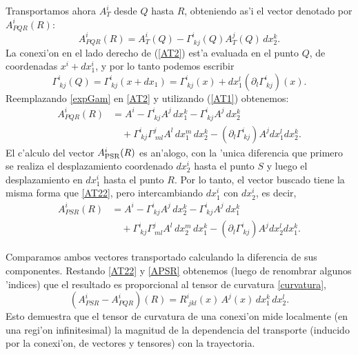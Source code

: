 Transportamos ahora $A_{T}^i $ desde $Q$ hasta $R$, obteniendo as'i el vector denotado por $A_{PQR}^i (R)$:
\begin{equation}
A_{PQR}^i (R) = A_{T}^i (Q) -\Gamma_{\ kj}^i(Q)A_{T}^j (Q)\,dx_2^k. \label{AT2}%
\end{equation}
 La conexi'on en el lado derecho de (\ref{AT2}) est'a evaluada en el punto $Q$, de coordenadas $x^i +dx_1^i$, y por lo tanto podemos escribir
\begin{equation}
\Gamma_{\ kj}^i(Q)=\Gamma_{\ kj}^i (x+dx_1)=\Gamma_{\ kj}^i(x)+dx_1^l(\partial_l\Gamma_{\ kj}^i) (x) . \label{expGam}
\end{equation}
Reemplazando \eqref{expGam} en \eqref{AT2} y utilizando (\ref{AT1}) obtenemos:%
\begin{align}
A_{PQR}^i (R) &= A^i -\Gamma_{\ kj}^i A^j\,dx_1^k-\Gamma_{\ kj}^i A^j\,dx_2^k \nonumber\\
& \quad  +\Gamma_{\ kj}^i \Gamma_{\ ml}^jA^l\, dx_1^m\,dx_2^k -(\partial_l\Gamma_{\ kj}^i) A^j dx_1^l dx_2^k. \label{AT22}
\end{align}
El c'alculo del vector $A_{\rm PSR}^i(R)$ es an'alogo, con la 'unica diferencia que primero se realiza el desplazamiento coordenado $dx_2^i$ hasta el punto $S$ y luego el desplazamiento en $dx_1^i$ hasta el punto $R$. Por lo tanto, el vector buscado tiene la misma forma que \eqref{AT22}, pero intercambiando $dx_1^i$ con $dx_2^i$, es decir,
\begin{align}
A_{PSR}^i (R) &= A^i -\Gamma_{\ kj}^i A^j\,dx_2^k-\Gamma_{\ kj}^i A^j\,dx_1^k \nonumber\\
& \quad  +\Gamma_{\ kj}^i \Gamma_{\ ml}^jA^l\, dx_2^m\,dx_1^k -(\partial_l\Gamma_{\ kj}^i) A^j dx_2^l dx_1^k. \label{APSR}
\end{align}

Comparamos ambos vectores transportado calculando la diferencia de sus componentes. Restando \eqref{AT22} y \eqref{APSR} obtenemos (luego de renombrar algunos 'indices) que el resultado es proporcional al tensor de curvatura \eqref{curvatura},
\begin{equation}
\boxed{(A_{PSR}^i-A^i_{PQR})(R) =R_{\ jkl}^i(x)\, A^j(x)\,dx_1^k\,dx_2^l.} \label{19}%
\end{equation}
Esto demuestra que el tensor de curvatura de una conexi'on mide localmente (en una regi'on infinitesimal) la magnitud de la dependencia del transporte (inducido por la conexi'on, de vectores y tensores) con la trayectoria.

